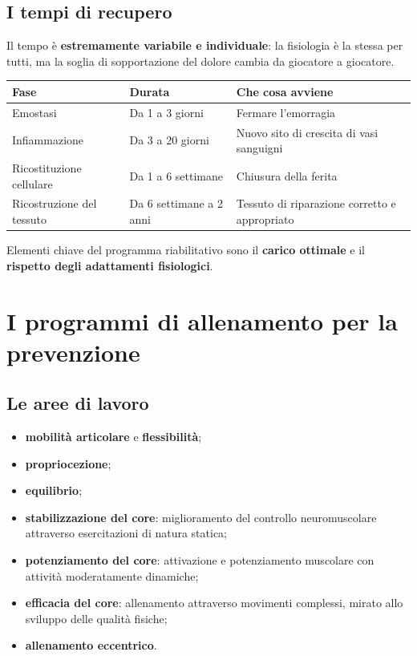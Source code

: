 \subsection{I tempi di recupero}

Il tempo è \textbf{estremamente variabile e individuale}: la fisiologia è la stessa per tutti, ma la
soglia di sopportazione del dolore cambia da giocatore a giocatore.

\begin{table}[htbp]
  \centering
  \small
  \renewcommand{\arraystretch}{1.3}
  \begin{tabularx}{\textwidth}{|l|l|X|}
    \hline
    \textbf{Fase} & \textbf{Durata} & \textbf{Che cosa avviene} \\
    \hline
    Emostasi & Da 1 a 3 giorni & Fermare l'emorragia \\
    \hline
    Infiammazione & Da 3 a 20 giorni & Nuovo sito di crescita di vasi sanguigni \\
    \hline
    Ricostituzione cellulare & Da 1 a 6 settimane & Chiusura della ferita \\
    \hline
    Ricostruzione del tessuto & Da 6 settimane a 2 anni & Tessuto di riparazione corretto e
      appropriato \\
    \hline
  \end{tabularx}
\end{table}

Elementi chiave del programma riabilitativo sono il \textbf{carico ottimale} e il \textbf{rispetto
degli adattamenti fisiologici}.

\section{I programmi di allenamento per la prevenzione}

\subsection{Le aree di lavoro}

\begin{itemize}
  \item \textbf{mobilità articolare} e \textbf{flessibilità};
  \item \textbf{propriocezione};
  \item \textbf{equilibrio};
  \item \textbf{stabilizzazione del core}: miglioramento del controllo neuromuscolare attraverso
    esercitazioni di natura statica;
  \item \textbf{potenziamento del core}: attivazione e potenziamento muscolare con attività
    moderatamente dinamiche;
  \item \textbf{efficacia del core}: allenamento attraverso movimenti complessi, mirato allo
    sviluppo delle qualità fisiche;
  \item \textbf{allenamento eccentrico}.
\end{itemize}

